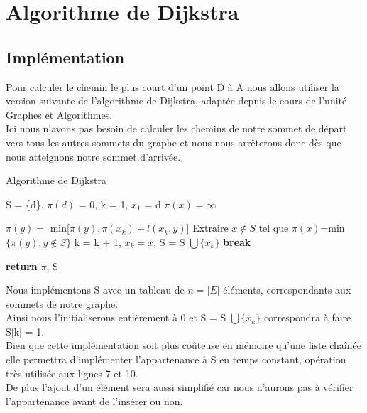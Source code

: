 \documentclass{article}
\begin{document}
\clearpage
\section{Algorithme de Dijkstra}
\subsection{Implémentation}

Pour calculer le chemin le plus court d'un point D à A nous allons utiliser 
la version suivante de l'algorithme de Dijkstra, adaptée depuis le cours de 
l'unité Graphes et Algorithmes.\\

Ici nous n'avons pas besoin de calculer les chemins de notre sommet de départ
vers tous les autres sommets du graphe et nous nous arrêterons donc dès
que nous atteignons notre sommet d'arrivée.

\begin{algorithm}
\caption{Algorithme de Dijkstra}\label{dijkstra}
\begin{algorithmic}[1]
	\State S = \{d\}, $\pi(d)$ = 0, k = 1, $x_1$ = d
		\State $\pi(x) = \infty$
	\EndFor
	
			\State $\pi(y) = $ min[$\pi(y), \pi(x_k) + l(x_k, y)$]
		\EndFor
		\State Extraire $x \not\in S$ tel que $\pi(x)$=min$\{\pi(y), y \not\in S\}$
		\State k = k + 1, $x_k = x$, S = S $\bigcup \{x_k\}$
			\State \textbf{break}
		\EndIf
	\EndWhile
	
	\State \textbf{return} $\pi$, S
\EndProcedure
\end{algorithmic}
\end{algorithm}

Nous implémentons S avec un tableau de $n = \vert E\vert$ éléments, correspondants aux sommets 
de notre graphe.\\
Ainsi nous l'initialiserons entièrement à 0 et S = S $\bigcup \{x_k\}$
correspondra à faire S[k] = 1.\\
Bien que cette implémentation soit plus coûteuse en mémoire qu'une liste chaînée
elle permettra d'implémenter l'appartenance à S en temps constant, opération très
utilisée aux lignes 7 et 10.\\
De plus l'ajout d'un élément sera aussi simplifié car nous n'aurons pas à vérifier
l'appartenance avant de l'insérer ou non.\\
\end{document}
